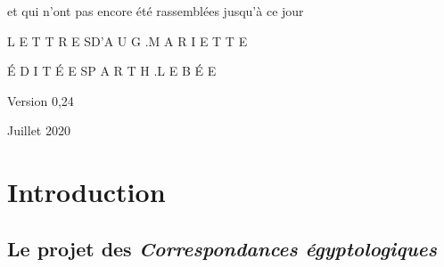 \documentclass{book}
\begin{document}
\begin{titlepage}
et qui n’ont pas encore été rassemblées jusqu’à ce jour
\vspace{9\baselineskip}

\LARGE L E T T R E S\space\space\space D\space ’\space A U G .\space\space\space M A R I E T T E
\vspace{4\baselineskip}

\normalsize É D I T É E S\space\space\space P A R \space\space\space T H .\space\space\space L E B É E
\vspace{4\baselineskip}

Version 0,24
\vspace{1\baselineskip}

Juillet 2020
\end{titlepage}
\thispagestyle{empty}
\chapter*{Introduction}
\setcounter{page}{1}

\section*{Le projet des \textit{Correspondances égyptologiques}}
\end{document}
